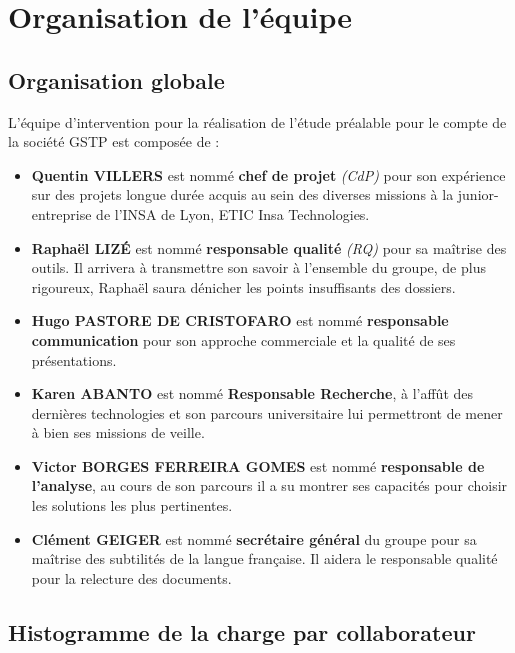 \section{Organisation de l'équipe}

\subsection{Organisation globale}

L'équipe d'intervention pour la réalisation de l'étude préalable pour le compte
de la société GSTP est composée de : 

\begin{itemize}
\item {\bf Quentin VILLERS} est nommé {\bf chef de projet} {\sl (CdP)} 
pour son expérience sur des projets longue durée acquis au sein des
diverses missions à la junior-entreprise de l'INSA de Lyon, ETIC Insa 
Technologies.
\item {\bf Raphaël LIZÉ} est nommé {\bf responsable qualité} {\sl (RQ)}
pour sa maîtrise des outils. Il arrivera à transmettre son savoir à
l'ensemble du groupe, de plus rigoureux, Raphaël saura dénicher les
points insuffisants des dossiers. 
\item {\bf Hugo PASTORE DE CRISTOFARO} est nommé {\bf responsable communication}
pour son approche commerciale et la qualité de ses présentations. 
\item {\bf Karen ABANTO} est nommé {\bf Responsable Recherche}, à l'affût
des dernières technologies et son parcours universitaire lui permettront
de mener à bien ses missions de veille.
\item {\bf Victor BORGES FERREIRA GOMES} est nommé {\bf responsable de
l'analyse}, au cours de son parcours il a su montrer ses capacités pour
choisir les solutions les plus pertinentes.
\item {\bf Clément GEIGER} est nommé {\bf secrétaire général} du groupe pour
sa maîtrise des subtilités de la langue française. Il aidera le responsable
qualité pour la relecture des documents.  
\end{itemize}

\subsection{Histogramme de la charge par collaborateur}

